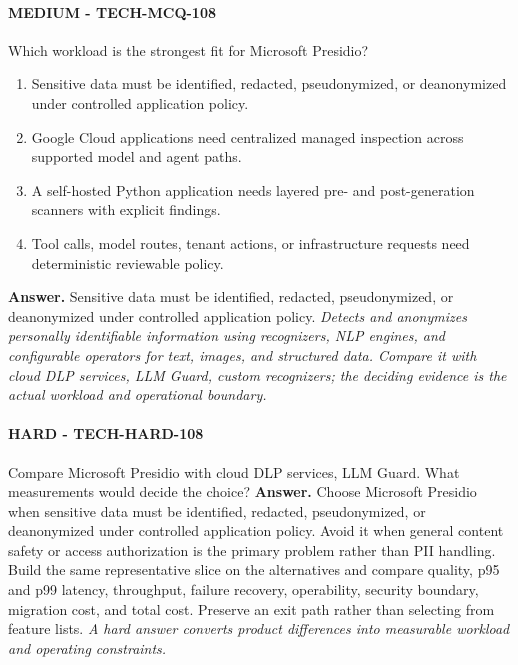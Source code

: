 \paragraph{MEDIUM - TECH-MCQ-108} Which workload is the strongest fit for Microsoft Presidio?
\begin{enumerate}[label=\Alph*.]
\item Sensitive data must be identified, redacted, pseudonymized, or deanonymized under controlled application policy.
\item Google Cloud applications need centralized managed inspection across supported model and agent paths.
\item A self-hosted Python application needs layered pre- and post-generation scanners with explicit findings.
\item Tool calls, model routes, tenant actions, or infrastructure requests need deterministic reviewable policy.
\end{enumerate}
\textbf{Answer.} Sensitive data must be identified, redacted, pseudonymized, or deanonymized under controlled application policy.
\textit{Detects and anonymizes personally identifiable information using recognizers, NLP engines, and configurable operators for text, images, and structured data. Compare it with cloud DLP services, LLM Guard, custom recognizers; the deciding evidence is the actual workload and operational boundary.}
\paragraph{HARD - TECH-HARD-108} Compare Microsoft Presidio with cloud DLP services, LLM Guard. What measurements would decide the choice?
\textbf{Answer.} Choose Microsoft Presidio when sensitive data must be identified, redacted, pseudonymized, or deanonymized under controlled application policy. Avoid it when general content safety or access authorization is the primary problem rather than PII handling. Build the same representative slice on the alternatives and compare quality, p95 and p99 latency, throughput, failure recovery, operability, security boundary, migration cost, and total cost. Preserve an exit path rather than selecting from feature lists.
\textit{A hard answer converts product differences into measurable workload and operating constraints.}
